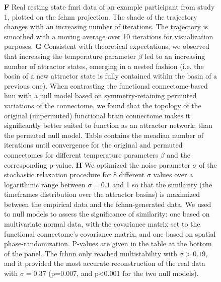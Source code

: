 \documentclass{article}
\begin{document}
\begin{figure}[!htbp]
{\textbf{F} Real resting state \acrshort{fmri} data of an example participant from study 1, plotted on the \acrshort{fchnn} projection. The shade of the trajectory changes with an increasing number of iterations. The trajectory is smoothed with a moving average over 10 iterations for visualization purposes.
\textbf{G} Consistent with theoretical expectations, we observed that increasing the temperature parameter $\beta$ led to an
increasing number of attractor states, emerging in a nested fashion (i.e. the basin of a new attractor state is fully contained within the basin of a previous one). When contrasting the functional connectome-based \acrshort{hnn} with a null model based on symmetry-retaining permuted variations of the connectome, we found that the topology of the original (unpermuted) functional brain connectome makes it significantly better suited to function as an attractor network; than the permuted null model. Table contains the meadian number of iterations until convergence for the original and permuted connectomes for different temperature parameters $\beta$ and the corresponding p-value.
\textbf{H} We optimized the noise parameter $\sigma$ of the stochastic relaxation procedure for 8 different $\sigma$ values over a logarithmic range between $\sigma=0.1$ and 1 so that the similarity (the timeframes distribution over the attractor basins) is maximized between the empirical data and the \acrshort{fchnn}-generated data. We used to null models to assess the significance of similarity: one based on multivariate normal data, with the covariance matrix set to the functional connectome's covariance matrix, and one based on spatial phase-randomization. P-values are given in the table at the bottom of the panel. The \acrshort{fchnn} only reached multistability with $\sigma>0.19$, and it provided the most accurate reconstruction of the real data with $\sigma=0.37$ (p=0.007, and p\textless 0.001 for the two null models).}
\label{attractors}
\end{figure}
\end{document}
